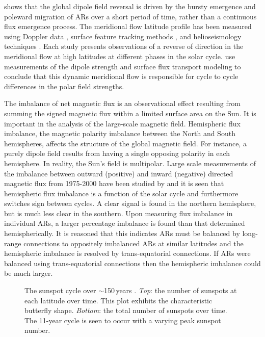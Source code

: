 \citet{Ulrich:2002} shows that the global dipole field reversal is driven by the bursty emergence and poleward migration of ARs over a short period of time, rather than a continuous flux emergence process. The meridional flow latitude profile has been measured using Doppler data \citep{Ulrich:2005}, surface feature tracking methods \citep{Hathaway:2010}, and helioseismology techniques \citep{Haber:2002,Zhao:2004}. Each study presents observations of a reverse of direction in the meridional flow at high latitudes at different phases in the solar cycle. \citet{Schrijver:2008b} use measurements of the dipole strength and surface flux transport modeling to conclude that this dynamic meridional flow is responsible for cycle to cycle differences in the polar field strengths.

The imbalance of net magnetic flux is an observational effect resulting from summing the signed magnetic flux within a limited surface area on the Sun. It is important in the analysis of the large-scale magnetic field. Hemispheric flux imbalance, the magnetic polarity imbalance between the North and South hemispheres, affects the structure of the global magnetic field. For instance, a purely dipole field results from having a single opposing polarity in each hemisphere. In reality, the Sun's field is multipolar.
Large scale measurements of the imbalance between outward (positive) and inward (negative) directed magnetic flux from 1975-2000 have been studied by \citet{Choudhary:2002} and it is seen that hemispheric flux imbalance is a function of the solar cycle and furthermore switches sign between cycles. A clear signal is found in the northern hemisphere, but is much less clear in the southern. Upon measuring flux imbalance in individual ARs, a larger percentage imbalance is found than that determined hemispherically. It is reasoned that this indicates ARs must be balanced by long-range connections to oppositely imbalanced ARs at similar latitudes and the hemispheric imbalance is resolved by trans-equatorial connections. If ARs were balanced using trans-equatorial connections then the hemispheric imbalance could be much larger.

\begin{landscape}
\begin{figure}
\caption[The sunspot cycle over $\sim$150\,years.]{The sunspot cycle over $\sim$150\,years \citep[from][]{Hathaway:2010b}. \emph{Top}: the number of sunspots at each latitude over time. This plot exhibits the characteristic butterfly shape. \emph{Bottom}: the total number of sunspots over time. The 11-year cycle is seen to occur with a varying peak sunspot number.}
\label{fig:sunspotnum}
\end{figure}
\end{landscape}

